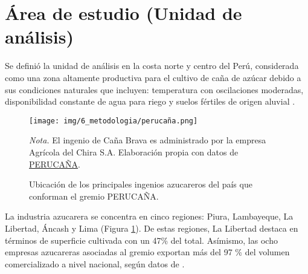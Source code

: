 \section{Área de estudio (Unidad de análisis)}
Se definió la unidad de análisis en la costa norte y centro del Perú, considerada
como una zona altamente productiva para el cultivo de caña de azúcar debido a sus condiciones naturales que incluyen: temperatura con 
oscilaciones moderadas, disponibilidad constante de agua para riego y suelos fértiles de origen aluvial 
\citep{helfgott_cultivo_2016}.  

\begin{figure}[H]
    \centering
    \caption{Ubicación de los principales ingenios azucareros del país que conforman el gremio PERUCAÑA.}
    \texttt{[image: img/6\_metodologia/perucaña.png]}
    \label{fig:ubicacion_cana}
    \begin{flushleft}
        \textit{Nota.} El ingenio de Caña Brava es administrado por la empresa Agrícola del Chira S.A. Elaboración propia con datos de \href{https://youtu.be/CMTbgXX8cGA?t=85}{PERUCAÑA}.     
        \vspace{-\baselineskip}
    \end{flushleft}
\end{figure}

La industria azucarera se concentra en cinco regiones: Piura, Lambayeque, La Libertad, Áncash y Lima (Figura \ref{fig:ubicacion_cana}).
De estas regiones, La Libertad destaca en términos de superficie cultivada con un 47\% del total.  Asímismo, las ocho empresas azucareras asociadas al gremio exportan más del 97 \% del volumen 
comercializado a nivel nacional, según datos de \citet{perucana_industria_2022}.



